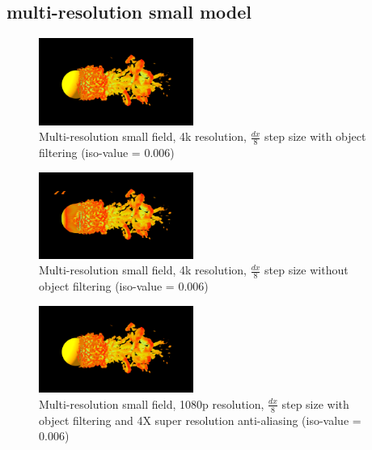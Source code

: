 \documentclass[acmtog]{acmart}
\begin{document}
    \subsection{multi-resolution small model}\label{subsec:multi-resolution-small-model}
    \begin{figure}[H]
        \centering
        \includegraphics[width=0.45\textwidth]{./image/mutli_small_4k_8_filter_0.006}
        \caption{Multi-resolution small field, 4k resolution, $ \frac{dx}{8} $ step size with object filtering (iso-value = 0.006)}\label{fig:figure5}
    \end{figure}

    \begin{figure}[H]
        \centering
        \includegraphics[width=0.45\textwidth]{./image/multi_small_4k_8_no_filter_0.006}
        \caption{Multi-resolution small field, 4k resolution, $ \frac{dx}{8} $ step size without object filtering (iso-value = 0.006)}\label{fig:figure6}
    \end{figure}

    \begin{figure}[H]
        \centering
        \includegraphics[width=0.45\textwidth]{./image/multi_small_1080p_8_filter_0.006_4XRES}
        \caption{Multi-resolution small field, 1080p resolution, $ \frac{dx}{8} $ step size with object filtering and 4X super resolution anti-aliasing (iso-value = 0.006)}\label{fig:figure7}
    \end{figure}
\end{document}
